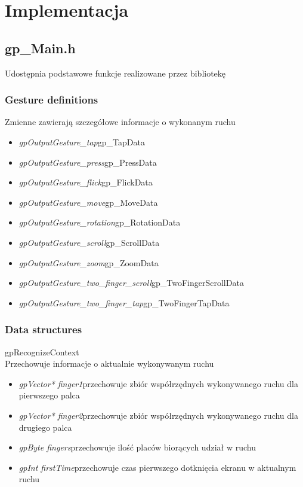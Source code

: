 \section{Implementacja}
\subsection{gp_Main.h}
Udostępnia podstawowe funkcje realizowane przez bibliotekę
\subsubsection{Gesture definitions} Zmienne zawierają szczegółowe informacje o wykonanym ruchu

\begin{itemize}
\item \textit{gpOutputGesture_tap}\quad gp_TapData
\item \textit{gpOutputGesture_press}\quad gp_PressData
\item \textit{gpOutputGesture_flick}\quad gp_FlickData
\item \textit{gpOutputGesture_move}\quad gp_MoveData
\item \textit{gpOutputGesture_rotation}\quad gp_RotationData
\item \textit{gpOutputGesture_scroll}\quad gp_ScrollData
\item \textit{gpOutputGesture_zoom}\quad gp_ZoomData
\item \textit{gpOutputGesture_two_finger_scroll}\quad gp_TwoFingerScrollData
\item \textit{gpOutputGesture_two_finger_tap}\quad gp_TwoFingerTapData
\end{itemize}
\subsubsection{Data structures}
\textsf{gpRecognizeContext} \\ \indent Przechowuje informacje o aktualnie wykonywanym ruchu
	\begin{itemize}
		\item \textit{gpVector* finger1}\quad przechowuje zbiór współrzędnych wykonywanego ruchu dla pierwszego palca
		\item \textit{gpVector* finger2}\quad przechowuje zbiór współrzędnych wykonywanego ruchu dla drugiego palca
		\item \textit{gpByte fingers}\quad przechowuje ilość placów biorących udział w ruchu
		\item \textit{gpInt firstTime}\quad przechowuje czas pierwszego dotknięcia ekranu w aktualnym ruchu
	\end{itemize}
\ \\
